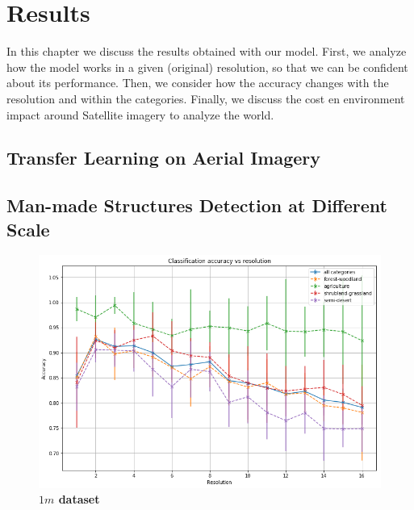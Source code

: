 
\chapter{Results} 

\label{Chapter5}


In this chapter we discuss the results obtained with our model. First, we analyze how the model works in a given (original) resolution, so that we can be confident about its performance. Then, we consider how the accuracy changes with the resolution and within the categories. Finally, we discuss the cost en environment impact around Satellite imagery to analyze the world. 

\section{Transfer Learning on Aerial Imagery}

\section{Man-made Structures Detection at Different Scale}

\begin{figure}[h!]
	\centering
	\includegraphics[width=\textwidth]{Figures/results/results_1m_all_categories.png}
	\captionsetup{width=1\linewidth}
	\caption{\textbf{$1m$ dataset}}
	\label{fig:acc_1m_all_cat}
\end{figure}

